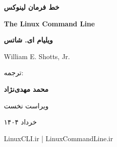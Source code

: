\begin{titlepage}
\centering
\vspace*{2.5cm}

{\fontsize{42}{50}\selectfont\bfseries خط فرمان لینوکس\par}

\vspace{1.2cm}
\begin{latin}
{\fontsize{24}{30}\selectfont\bfseries The Linux Command Line\par}
\end{latin}

\vspace{2.5cm}
{\Large\bfseries ویلیام ای. شاتس\par}
\vspace{0.4cm}
\begin{latin}
{\large William E. Shotts, Jr.\par}
\end{latin}

\vspace{1.5cm}
{\Large ترجمه:\par}
\vspace{0.3cm}
{\Large\bfseries محمد مهدی‌نژاد\par}

\vfill

{\large ویراست نخست\par}
\vspace{0.2cm}
{\large خرداد ۱۴۰۴\par}

\vspace{0.5cm}
\begin{latin}
{\small LinuxCLI.ir \;|\; LinuxCommandLine.ir\par}
\end{latin}

\end{titlepage}
